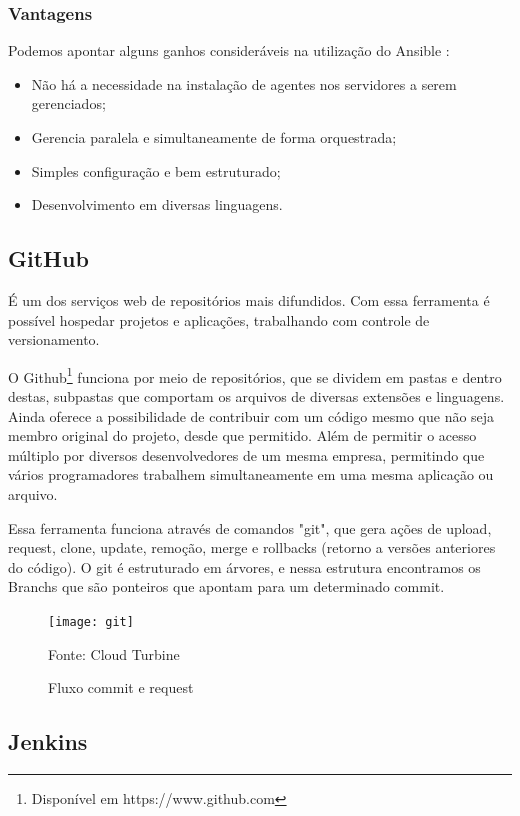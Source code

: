 \subsubsection{Vantagens}
Podemos apontar alguns ganhos consideráveis na utilização do Ansible \cite{juniordevops} :
\begin{itemize}
	\item Não há a necessidade na instalação de agentes nos servidores a serem gerenciados;
	\item Gerencia paralela e simultaneamente de forma orquestrada; 
	\item Simples configuração e bem estruturado;
	\item Desenvolvimento em diversas linguagens.
\end{itemize}

\subsection{GitHub }
É um dos serviços web de repositórios mais difundidos. Com essa ferramenta é possível hospedar projetos e aplicações, trabalhando com controle de versionamento.

O Github\footnote{Disponível em https://www.github.com} funciona por meio de repositórios, que se dividem em pastas e dentro destas, subpastas que comportam os arquivos de diversas extensões e linguagens. Ainda oferece a possibilidade de contribuir com um código mesmo que não seja membro original do projeto, desde que permitido. Além de permitir o acesso múltiplo por diversos desenvolvedores de um mesma empresa, permitindo que vários programadores trabalhem simultaneamente em uma mesma aplicação ou arquivo.

Essa ferramenta funciona através de comandos "git", que gera ações de upload, request, clone, update, remoção, merge e rollbacks (retorno a versões anteriores do código). O git é estruturado em árvores, e nessa estrutura encontramos os Branchs que são ponteiros que apontam para um determinado commit.

\begin{figure} [htb]
	\centering
	\texttt{[image: git]}
	\caption{Fluxo commit e request}
	Fonte: Cloud Turbine\footnotemark
	\label{fig:git}
\end{figure}

\subsection{Jenkins}

